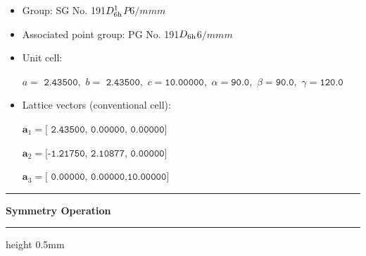 \documentclass[fleqn,10pt,landscape]{jsarticle}
\begin{document}
\begin{itemize}
\item Group: SG No. 191\quad$D_{\rm 6h}^{1}$\quad$P6/mmm$\quad[ hexagonal ]
\item Associated point group: PG No. 191\quad$D_{\rm 6h}$\quad$6/mmm$\quad[ hexagonal ]
\end{itemize}
\begin{itemize}
\item Unit cell:

\quad $a=\texttt{ 2.43500},\,\, b=\texttt{ 2.43500},\,\, c=\texttt{10.00000},\,\, \alpha=\texttt{90.0},\,\, \beta=\texttt{90.0},\,\, \gamma=\texttt{120.0}$

\item Lattice vectors (conventional cell):

\quad $\bm{a}_1=\texttt{[ 2.43500, 0.00000, 0.00000]}$

\quad $\bm{a}_2=\texttt{[-1.21750, 2.10877, 0.00000]}$

\quad $\bm{a}_3=\texttt{[ 0.00000, 0.00000,10.00000]}$

\end{itemize}
\vspace{5mm}
\noindent \rule[0.5mm]{5mm}{0.5mm}\hspace{3mm}\textbf{Symmetry Operation}\hspace{3mm}\leaders\hrule height 0.5mm\hfill\kern0pt
\vspace{3mm}
\end{document}
